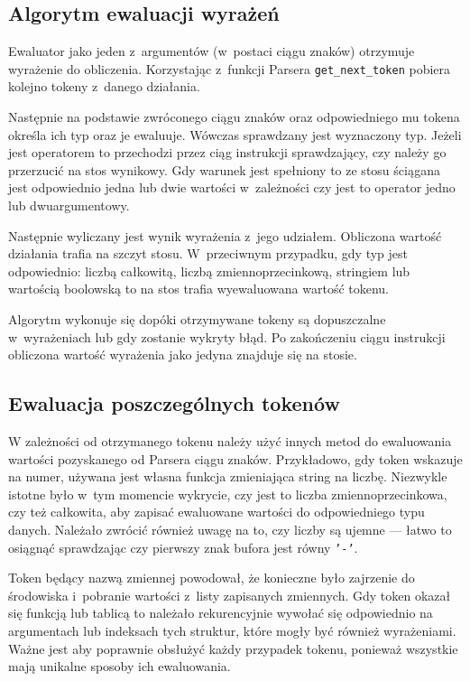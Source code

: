 \documentclass[shortabstract]{iithesis}
\begin{document}
\subsection{Algorytm ewaluacji wyrażeń}
Ewaluator jako jeden z~argumentów (w~postaci ciągu znaków) otrzymuje wyrażenie do obliczenia. Korzystając z~funkcji Parsera \texttt{get\_next\_token} pobiera kolejno tokeny z~danego działania.

Następnie na podstawie zwróconego ciągu znaków oraz odpowiedniego mu tokena określa ich typ oraz je ewaluuje. Wówczas sprawdzany jest wyznaczony typ. Jeżeli jest operatorem to przechodzi przez ciąg instrukcji sprawdzający, czy należy go przerzucić na stos wynikowy. Gdy warunek jest spełniony to ze stosu ściągana jest odpowiednio jedna lub dwie wartości w~zależności czy jest to operator jedno lub dwuargumentowy.

Następnie wyliczany jest wynik wyrażenia z~jego udziałem. Obliczona wartość działania trafia na szczyt stosu. W~przeciwnym przypadku, gdy typ jest odpowiednio: liczbą całkowitą, liczbą zmiennoprzecinkową, stringiem lub wartością boolowską to na stos trafia wyewaluowana wartość tokenu.

Algorytm wykonuje się dopóki otrzymywane tokeny są dopuszczalne w~wyrażeniach lub gdy zostanie wykryty błąd. Po zakończeniu ciągu instrukcji obliczona wartość wyrażenia jako jedyna znajduje się na stosie.

\subsection{Ewaluacja poszczególnych tokenów}
W zależności od otrzymanego tokenu należy użyć innych metod do ewaluowania wartości pozyskanego od Parsera ciągu znaków. Przykładowo, gdy token wskazuje na numer, używana jest własna funkcja zmieniająca string na liczbę. Niezwykle istotne było w~tym momencie wykrycie, czy jest to liczba zmiennoprzecinkowa, czy też całkowita, aby zapisać ewaluowane wartości do odpowiedniego typu danych. Należało zwrócić również uwagę na to, czy liczby są ujemne --- łatwo to osiągnąć sprawdzając czy pierwszy znak bufora jest równy \texttt{'-'}.

Token będący nazwą zmiennej powodował, że konieczne było zajrzenie do środowiska i~pobranie wartości z~listy zapisanych zmiennych. Gdy token okazał się funkcją lub tablicą to należało rekurencyjnie wywołać się odpowiednio na argumentach lub indeksach tych struktur, które mogły być również wyrażeniami. Ważne jest aby poprawnie obsłużyć każdy przypadek tokenu, ponieważ wszystkie mają unikalne sposoby ich ewaluowania.
\end{document}
